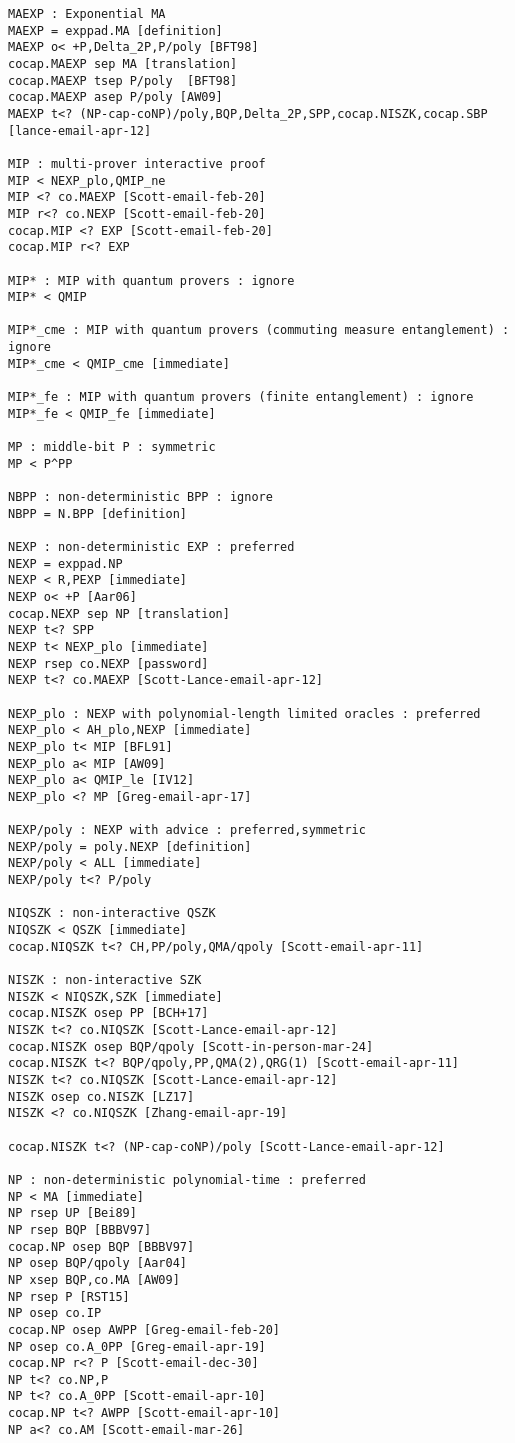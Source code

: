 \begin{verbatim}
MAEXP : Exponential MA
MAEXP = exppad.MA [definition]
MAEXP o< +P,Delta_2P,P/poly [BFT98]
cocap.MAEXP sep MA [translation]
cocap.MAEXP tsep P/poly  [BFT98]
cocap.MAEXP asep P/poly [AW09]
MAEXP t<? (NP-cap-coNP)/poly,BQP,Delta_2P,SPP,cocap.NISZK,cocap.SBP [lance-email-apr-12]

MIP : multi-prover interactive proof
MIP < NEXP_plo,QMIP_ne
MIP <? co.MAEXP [Scott-email-feb-20]
MIP r<? co.NEXP [Scott-email-feb-20]
cocap.MIP <? EXP [Scott-email-feb-20]
cocap.MIP r<? EXP

MIP* : MIP with quantum provers : ignore
MIP* < QMIP

MIP*_cme : MIP with quantum provers (commuting measure entanglement) : ignore
MIP*_cme < QMIP_cme [immediate]

MIP*_fe : MIP with quantum provers (finite entanglement) : ignore
MIP*_fe < QMIP_fe [immediate]

MP : middle-bit P : symmetric
MP < P^PP

NBPP : non-deterministic BPP : ignore
NBPP = N.BPP [definition]

NEXP : non-deterministic EXP : preferred
NEXP = exppad.NP
NEXP < R,PEXP [immediate]
NEXP o< +P [Aar06]
cocap.NEXP sep NP [translation]
NEXP t<? SPP
NEXP t< NEXP_plo [immediate]
NEXP rsep co.NEXP [password]
NEXP t<? co.MAEXP [Scott-Lance-email-apr-12]

NEXP_plo : NEXP with polynomial-length limited oracles : preferred
NEXP_plo < AH_plo,NEXP [immediate]
NEXP_plo t< MIP [BFL91]
NEXP_plo a< MIP [AW09]
NEXP_plo a< QMIP_le [IV12]
NEXP_plo <? MP [Greg-email-apr-17]

NEXP/poly : NEXP with advice : preferred,symmetric
NEXP/poly = poly.NEXP [definition]
NEXP/poly < ALL [immediate]
NEXP/poly t<? P/poly

NIQSZK : non-interactive QSZK
NIQSZK < QSZK [immediate]
cocap.NIQSZK t<? CH,PP/poly,QMA/qpoly [Scott-email-apr-11]

NISZK : non-interactive SZK
NISZK < NIQSZK,SZK [immediate]
cocap.NISZK osep PP [BCH+17]
NISZK t<? co.NIQSZK [Scott-Lance-email-apr-12]
cocap.NISZK osep BQP/qpoly [Scott-in-person-mar-24]
cocap.NISZK t<? BQP/qpoly,PP,QMA(2),QRG(1) [Scott-email-apr-11]
NISZK t<? co.NIQSZK [Scott-Lance-email-apr-12]
NISZK osep co.NISZK [LZ17]
NISZK <? co.NIQSZK [Zhang-email-apr-19]

cocap.NISZK t<? (NP-cap-coNP)/poly [Scott-Lance-email-apr-12]

NP : non-deterministic polynomial-time : preferred
NP < MA [immediate]
NP rsep UP [Bei89]
NP rsep BQP [BBBV97]
cocap.NP osep BQP [BBBV97]
NP osep BQP/qpoly [Aar04]
NP xsep BQP,co.MA [AW09]
NP rsep P [RST15]
NP osep co.IP
cocap.NP osep AWPP [Greg-email-feb-20]
NP osep co.A_0PP [Greg-email-apr-19]
cocap.NP r<? P [Scott-email-dec-30]
NP t<? co.NP,P
NP t<? co.A_0PP [Scott-email-apr-10]
cocap.NP t<? AWPP [Scott-email-apr-10]
NP a<? co.AM [Scott-email-mar-26]



\end{verbatim}
